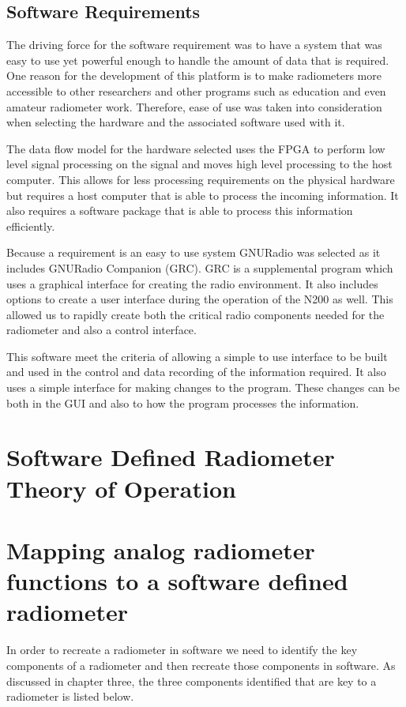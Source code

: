 \subsection{Software Requirements}

The driving force for the software requirement was to have a system that was easy to use yet powerful enough to handle the amount of data that is required.  One reason for the development of this platform is to make radiometers more accessible to other researchers and other programs such as education and even amateur radiometer work.  Therefore, ease of use was taken into consideration when selecting the hardware and the associated software used with it.

The data flow model for the hardware selected uses the FPGA to perform low level signal processing on the signal and moves high level processing to the host computer.  This allows for less processing requirements on the physical hardware but requires a host computer that is able to process the incoming information.  It also requires a software package that is able to process this information efficiently. 

Because a requirement is an easy to use system GNURadio was selected as it includes GNURadio Companion (GRC). GRC is a supplemental program which uses a graphical interface for creating the radio environment.  It also includes options to create a user interface during the operation of the N200 as well.  This allowed us to rapidly create both the critical radio components needed for the radiometer and also a control interface.

This software meet the criteria of allowing a simple to use interface to be built and used in the control and data recording of the information required.  It also uses a simple interface for making changes to the program.  These changes can be both in the GUI and also to how the program processes the information.

\section{Software Defined Radiometer Theory of Operation}

\section{Mapping analog radiometer functions to a software defined radiometer}

In order to recreate a radiometer in software we need to identify the key components of a radiometer and then recreate those components in software.  As discussed in chapter three, the three components identified that are key to a radiometer is listed below.

